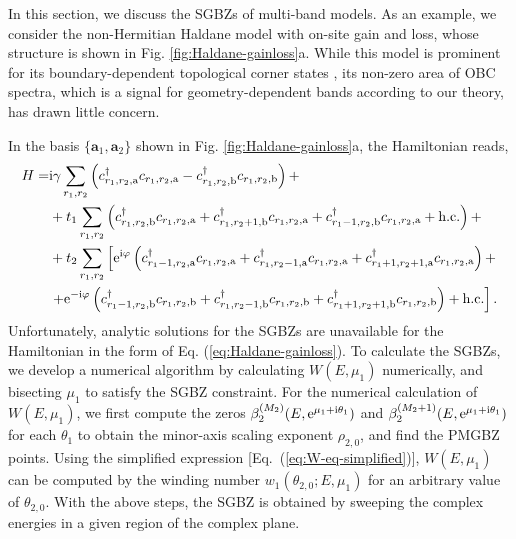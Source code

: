 In this section, we discuss the SGBZs of multi-band models. As an
example, we consider the non-Hermitian Haldane model with on-site
gain and loss, whose structure is shown in Fig. \ref{fig:Haldane-gainloss}a.
While this model is prominent for its boundary-dependent topological
corner states \cite{liGainLossInducedHybridSkinTopological2022,jiangObservationNonHermitianBoundary2024,sunPhotonicFloquetSkinTopological2024,PhysRevLett.133.126601},
its non-zero area of OBC spectra, which is a signal for geometry-dependent
bands according to our theory, has drawn little concern.

In the basis $\{\mathbf{a}_{1},\mathbf{a}_{2}\}$ shown in Fig. \ref{fig:Haldane-gainloss}a,
the Hamiltonian reads, 
\begin{align}
H= & \mathrm{i}\gamma\sum_{r_{1},r_{2}}\left(c_{r_{1},r_{2},\mathrm{a}}^{\dagger}c_{r_{1},r_{2},\mathrm{a}}-c_{r_{1},r_{2},\mathrm{b}}^{\dagger}c_{r_{1},r_{2},\mathrm{b}}\right)+\nonumber \\
 & +t_{1}\sum_{r_{1},r_{2}}\left(c_{r_{1},r_{2},\mathrm{b}}^{\dagger}c_{r_{1},r_{2},\mathrm{a}}+c_{r_{1},r_{2}+1,\mathrm{b}}^{\dagger}c_{r_{1},r_{2},\mathrm{a}}+c_{r_{1}-1,r_{2},\mathrm{b}}^{\dagger}c_{r_{1},r_{2},\mathrm{a}}+\text{h.c.}\right)+\nonumber \\
 & +t_{2}\sum_{r_{1},r_{2}}\left[\mathrm{e}^{\mathrm{i}\varphi}\left(c_{r_{1}-1,r_{2},\mathrm{a}}^{\dagger}c_{r_{1},r_{2},\mathrm{a}}+c_{r_{1},r_{2}-1,\mathrm{a}}^{\dagger}c_{r_{1},r_{2},\mathrm{a}}+c_{r_{1}+1,r_{2}+1,\mathrm{a}}^{\dagger}c_{r_{1},r_{2},\mathrm{a}}\right)+\right.\nonumber \\
 & \left.+\mathrm{e}^{-\mathrm{i}\varphi}\left(c_{r_{1}-1,r_{2},\mathrm{b}}^{\dagger}c_{r_{1},r_{2},\mathrm{b}}+c_{r_{1},r_{2}-1,\mathrm{b}}^{\dagger}c_{r_{1},r_{2},\mathrm{b}}+c_{r_{1}+1,r_{2}+1,\mathrm{b}}^{\dagger}c_{r_{1},r_{2},\mathrm{b}}\right)+\text{h.c.}\right].\label{eq:Haldane-gainloss}
\end{align}
Unfortunately, analytic solutions for the SGBZs are unavailable for
the Hamiltonian in the form of Eq. (\ref{eq:Haldane-gainloss}). To
calculate the SGBZs, we develop a numerical algorithm by calculating
$W(E,\mu_{1})$ numerically, and bisecting $\mu_{1}$ to satisfy the
SGBZ constraint. For the numerical calculation of $W(E,\mu_{1})$,
we first compute the zeros $\beta_{2}^{(M_{2})}(E,\mathrm{e}^{\mu_{1}+\mathrm{i}\theta_{1}})$
and $\beta_{2}^{(M_{2}+1)}(E,\mathrm{e}^{\mu_{1}+\mathrm{i}\theta_{1}})$ for
each $\theta_{1}$ to obtain the minor-axis scaling exponent $\rho_{2,0}$,
and find the PMGBZ points. Using the simplified expression {[}Eq.~(\ref{eq:W-eq-simplified}){]}, $W(E,\mu_{1})$ can be computed by the winding number $w_{1}(\theta_{2,0};E,\mu_{1})$
for an arbitrary value of $\theta_{2,0}$. With the above steps, the
SGBZ is obtained by sweeping the complex energies in a given region
of the complex plane.


